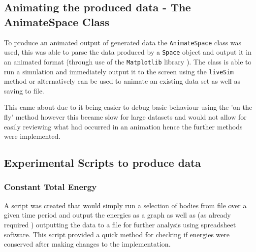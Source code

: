 \documentclass{article}
\begin{document}
        \subsection{Animating the produced data - The AnimateSpace Class}
        To produce an animated output of generated data the \verb|AnimateSpace| class was used, this
        was able to parse the data produced by a \verb|Space| object and output it in an animated 
        format (through use of the \verb|Matplotlib| library
        \cite{MatPlotLib}). 
        The class is able to run a simulation and immediately output it to the screen using the 
        \verb|liveSim| method or alternatively can be used to animate an existing data set as well
        as saving to file.
        \par 
        This came about due to it being easier to debug basic behaviour using the 'on the fly' 
        method however this became slow for large datasets and would not allow for easily reviewing 
        what had occurred in an animation hence the further methods were implemented.
  
        

        
        \subsection{Experimental Scripts to produce data}
            \subsubsection{Constant Total Energy} \label{S:ConstantTotalEnergyMethod}
                A script was created that would simply run a selection of bodies from file over a 
                given time period and output the energies as a graph as well as (as already required
                ) outputting the data to a file for further analysis using spreadsheet software. 
                This script provided a quick method for checking if energies were conserved after 
                making changes to the implementation.
\end{document}
